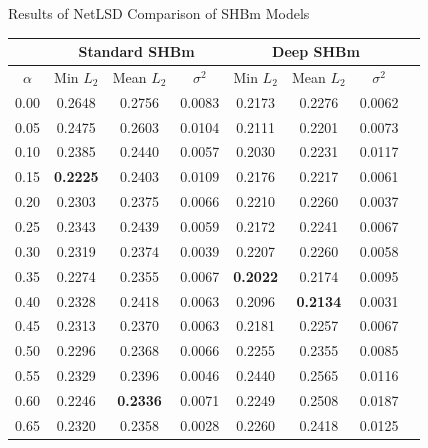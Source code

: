 \begin{singlespacing}
    \begin{center}
    \begin{threeparttable}
    \caption{Results of NetLSD Comparison of SHBm Models}
    \label{fig:tab_SHBm_results}\begin{small}
        \begin{tabular}{|l|c|c|c|c|c|c|c|} \hline
        \multicolumn{1}{|c|}{} & \multicolumn{3}{|c|}{Standard SHBm} & \multicolumn{3}{|c|}{Deep SHBm} \\ \hline
        \multicolumn{1}{|c|}{$\alpha$} & Min $L_{2}$ & Mean $L_{2}$ & $\sigma^{2}$  & Min $L_{2}$ &  Mean $L_{2}$ & $\sigma^{2}$ \\  \cline{6-7}
        \hline
            0.00  & 0.2648 & 0.2756 & 0.0083   &  0.2173 & 0.2276 & 0.0062 \\
        \hline
            0.05  & 0.2475 & 0.2603 & 0.0104   &  0.2111 & 0.2201 & 0.0073 \\
        \hline
            0.10  & 0.2385 & 0.2440 & 0.0057   &  0.2030 & 0.2231 & 0.0117 \\
        \hline
            0.15  & \textbf{0.2225} & 0.2403 & 0.0109   &  0.2176 & 0.2217 & 0.0061 \\
        \hline
            0.20  & 0.2303 & 0.2375 & 0.0066   &  0.2210 & 0.2260 & 0.0037 \\
        \hline
            0.25  & 0.2343 & 0.2439 & 0.0059   &  0.2172 & 0.2241 & 0.0067 \\
        \hline
            0.30  & 0.2319 & 0.2374 & 0.0039   &  0.2207 & 0.2260 & 0.0058 \\
        \hline
            0.35  & 0.2274 & 0.2355 & 0.0067   &  \textbf{0.2022} & 0.2174 & 0.0095 \\
        \hline
            0.40  & 0.2328 & 0.2418 & 0.0063   &  0.2096 & \textbf{0.2134} & 0.0031 \\
        \hline
            0.45  & 0.2313 & 0.2370 & 0.0063   &  0.2181 & 0.2257 & 0.0067 \\
        \hline
            0.50  & 0.2296 & 0.2368 & 0.0066   &  0.2255 & 0.2355 & 0.0085 \\
        \hline
            0.55  & 0.2329 & 0.2396 & 0.0046   &  0.2440 & 0.2565 & 0.0116 \\
        \hline
            0.60  & 0.2246 & \textbf{0.2336} & 0.0071   &  0.2249 & 0.2508 & 0.0187 \\
        \hline
            0.65  & 0.2320 & 0.2358 & 0.0028   &  0.2260 & 0.2418 & 0.0125 \\

\end{tabular}
\end{small}
\end{threeparttable}
\end{center}
\end{singlespacing}
